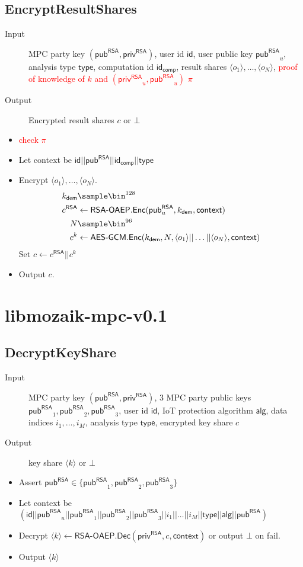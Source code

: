 \documentclass[10pt,a4paper]{article}
\newcommand{\pub}{\ensuremath{\mathsf{pub}}}
\newcommand{\priv}{\ensuremath{\mathsf{priv}}}
\newcommand{\pubRSA}{\ensuremath{\pub^{\mathsf{RSA}}}}
\newcommand{\privRSA}{\ensuremath{\priv^{\mathsf{RSA}}}}
\newcommand{\id}{\ensuremath{\mathsf{id}}}
\newcommand{\idcomp}{\ensuremath{\mathsf{id}_{\mathsf{comp}}}}
\newcommand{\type}{\ensuremath{\mathsf{type}}}
\newcommand{\alg}{\ensuremath{\mathsf{alg}}}
\newcommand{\kdem}{\ensuremath{k_{\mathsf{dem}}}}
\newcommand{\share}[1]{\ensuremath{\langle #1 \rangle}}
\newcommand{\RSAOAEP}{\ensuremath{\textsf{RSA-OAEP}}}
\newcommand{\AESGCM}{\ensuremath{\textsf{AES-GCM}}}
\newcommand{\Encrypt}{\ensuremath{\textsf{Enc}}}
\newcommand{\Decrypt}{\ensuremath{\textsf{Dec}}}
\begin{document}
{\subsection{EncryptResultShares}
\begin{description}
	\item[Input] MPC party key $(\pubRSA,\privRSA)$, user id $\id$, user public key $\pubRSA_u$, analysis type $\type$, computation id $\idcomp$, result shares $\share{o_1}, \dots, \share{o_N}$, \textcolor{red}{proof of knowledge of $k$ and $(\privRSA_u, \pubRSA_u)$ $\pi$}
	\item[Output] Encrypted result shares $c$ or $\bot$
\end{description}
\begin{itemize}
	\item \textcolor{red}{check $\pi$}
	\item Let context be $\id||\pubRSA||\idcomp||\type$
	\item Encrypt $\share{o_1}, \dots, \share{o_N}$.
	\begin{align*}
		\kdem & \sample \bin^{128} \\
		c^{\mathsf{RSA}} & \gets \RSAOAEP.\Encrypt(\pubRSA_u, \kdem, \mathsf{context}) \\
		N & \sample \bin^{96} \\
		c^k & \gets \AESGCM.\Encrypt(\kdem,N,\share{o_1}||\dots||\share{o_N},\mathsf{context})
	\end{align*}
	Set $c \gets c^{\mathsf{RSA}}||c^k$
	\item Output $c$.
\end{itemize}
}


\section{libmozaik-mpc-v0.1}
\newpage
\subsection{DecryptKeyShare}
\begin{description}
	\item[Input] MPC party key $(\pubRSA,\privRSA)$, 3 MPC party public keys $\pubRSA_1, \pubRSA_2, \pubRSA_3$, user id $\id$, IoT protection algorithm $\alg$, data indices $i_1, \dots, i_M$, analysis type $\type$, encrypted key share $c$
	\item[Output] key share $\share{k}$ or $\bot$
\end{description}
\begin{itemize}
	\item Assert $\pubRSA \in \{\pubRSA_1, \pubRSA_2, \pubRSA_3\}$
	\item Let context be $(\id||\pubRSA_u||\pubRSA_1||\pubRSA_2||\pubRSA_3||i_1||\dots||i_M||\type||\alg||\pubRSA)$
	\item Decrypt $\share{k} \gets \RSAOAEP.\Decrypt(\privRSA,c,\mathsf{context})$ or output  $\bot$ on fail.
	\item Output $\share{k}$
\end{itemize}
\end{document}
